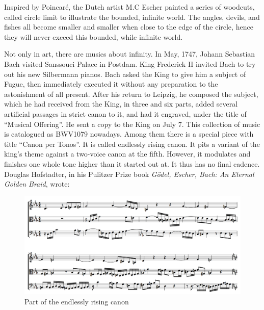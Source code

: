 \documentclass{article}
\begin{document}
Inspired by Poincaré, the Dutch artist M.C Escher painted a series of woodcuts, called circle limit to illustrate the bounded, infinite world. The angles, devils, and fishes all become smaller and smaller when close to the edge of the circle, hence they will never exceed this bounded, while infinite world.

Not only in art, there are musics about infinity. In May, 1747, Johann Sebastian Bach visited Sanssouci Palace in Postdam. King Frederick II invited Bach to try out his new Silbermann pianos. Bach asked the King to give him a subject of Fugue, then immediately executed it without any preparation to the astonishment of all present. After his return to Leipzig, he composed the subject, which he had received from the King, in three and six parts, added several artificial passages in strict canon to it, and had it engraved, under the title of ``Musical Offering''. He sent a copy to the King on July 7. This collection of music is catalogued as BWV1079 nowadays. Among them there is a special piece with title ``Canon per Tonos''. It is called endlessly rising canon. It pits a variant of the king’s theme against a two-voice canon at the fifth. However, it modulates and finishes one whole tone higher than it started out at. It thus has no final cadence. Douglas Hofstadter, in his Pulitzer Prize book {\em Gödel, Escher, Bach: An Eternal Golden Braid}, wrote:

\begin{figure}[htbp]
 \centering
 \includegraphics[scale=0.3]{img/canon-endless.png}
 \captionsetup{labelformat=empty}
 \caption{Part of the endlessly rising canon}
 \label{fig:canon-endless}
\end{figure}
\end{document}
